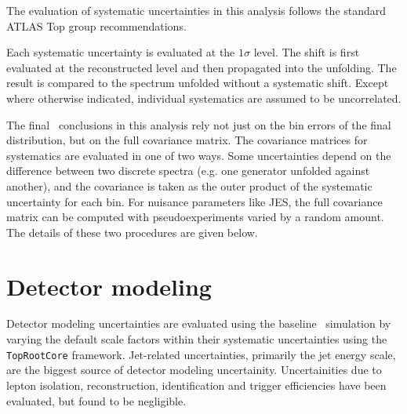 
The evaluation of systematic uncertainties in this analysis follows the standard ATLAS Top group recommendations.

Each systematic uncertainty is evaluated at the $1\sigma$ level. The shift is first evaluated at the reconstructed level and then propagated into the unfolding. The result is compared to the spectrum unfolded without a systematic shift. Except where otherwise indicated, individual systematics are assumed to be uncorrelated. 

The final \chisq\ conclusions in this analysis rely not just on the bin errors of the final distribution, but on the full covariance matrix. The covariance matrices for systematics are evaluated in one of two ways. Some uncertainties depend on the difference between two discrete spectra (e.g. one generator unfolded against another), and the covariance is taken as the outer product of the systematic uncertainty for each bin. For nuisance parameters like JES, the full covariance matrix can be computed with pseudoexperiments varied by a random amount. The details of these two procedures are given below.

\section{Detector modeling}
Detector modeling uncertainties are evaluated using the baseline \ttbar\ simulation by varying the
default scale factors within their systematic uncertainties using the \texttt{ TopRootCore} framework. Jet-related uncertainties, primarily the jet energy scale, are the biggest source of detector modeling uncertainity. Uncertainities due to lepton isolation, reconstruction, identification and trigger efficiencies have been evaluated, but found to be negligible. 


